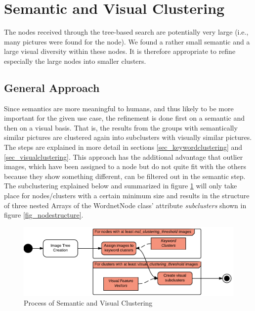 %
\section{Semantic and Visual Clustering}
\label{sec_inhalt}

The nodes received through the tree-based search are potentially very large (i.e., many pictures were found for the node). We found a rather small semantic and a large visual diversity within these nodes. It is therefore appropriate to refine especially the large nodes into smaller clusters.

\subsection{General Approach}
Since semantics are more meaningful to humans, and thus likely to be more important for the given use case, the refinement is done first on a semantic and then on a visual basis. That is, the results from the groups with semantically similar pictures are clustered again into subclusters with visually similar pictures. The steps are explained in more detail in sections \ref{sec_keywordclustering} and \ref{sec_visualclustering}.
This approach has the additional advantage that outlier images, which have been assigned to a node but do not quite fit with the others because they show something different, can be filtered out in the semantic step. \\
The subclustering explained below and summarized in figure \ref{fig_semanticandvisual} will only take place for nodes/clusters with a certain minimum size and results in the structure of three nested Arrays of the WordnetNode class' attribute \emph{subclusters} shown in figure \ref{fig_nodestructure}.

\begin{figure}[h]
\centering
\includegraphics[width=\textwidth]{images/semantic_and_visual_clustering.pdf}
\caption{Process of Semantic and Visual Clustering}
\label{fig_semanticandvisual}
\end{figure}

